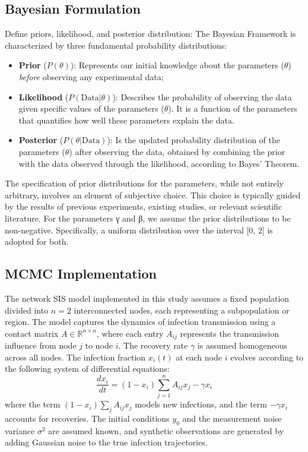 \documentclass[a4paper,10pt]{report}
\begin{document}
\subsection{Bayesian Formulation}
Define priors, likelihood, and posterior distribution:
The Bayesian Framework is characterized by three fundamental probability distributions:
\begin{itemize}
    \item \textbf{Prior} ($P(\theta)$): Represents our initial knowledge about the parameters ($\theta$) \emph{before} observing any experimental data;
    \item \textbf{Likelihood} ($P(\text{Data}|\theta)$): Describes the probability of observing the data given specific values of the parameters ($\theta$). It is a function of the parameters that quantifies how well these parameters explain the data.
    \item \textbf{Posterior} ($P(\theta|\text{Data})$): Is the updated probability distribution of the parameters ($\theta$) after observing the data, obtained by combining the prior with the data observed through the likelihood, according to Bayes' Theorem.
\end{itemize}
The specification of prior distributions for the parameters, while not entirely arbitrary, involves an element of subjective choice. This choice is typically guided by the results of previous experiments, existing studies, or relevant scientific literature. For the parameters γ and β, we assume the prior distributions to be non-negative. Specifically, a uniform distribution over the interval [0, 2] is adopted for both.
\subsection{MCMC Implementation}

The network SIS model implemented in this study assumes a fixed population divided into $n = 2$ interconnected nodes, each representing a subpopulation or region. The model captures the dynamics of infection transmission using a contact matrix $A \in \mathbb{R}^{n \times n}$, where each entry $A_{ij}$ represents the transmission influence from node $j$ to node $i$. The recovery rate $\gamma$ is assumed homogeneous across all nodes. The infection fraction $x_i(t)$ at each node $i$ evolves according to the following system of differential equations:
\[
\frac{dx_i}{dt} = (1 - x_i) \sum_{j=1}^{n} A_{ij} x_j - \gamma x_i
\]
where the term $(1 - x_i) \sum_j A_{ij} x_j$ models new infections, and the term $-\gamma x_i$ accounts for recoveries. The initial conditions $y_0$ and the measurement noise variance $\sigma^2$ are assumed known, and synthetic observations are generated by adding Gaussian noise to the true infection trajectories.
\end{document}
